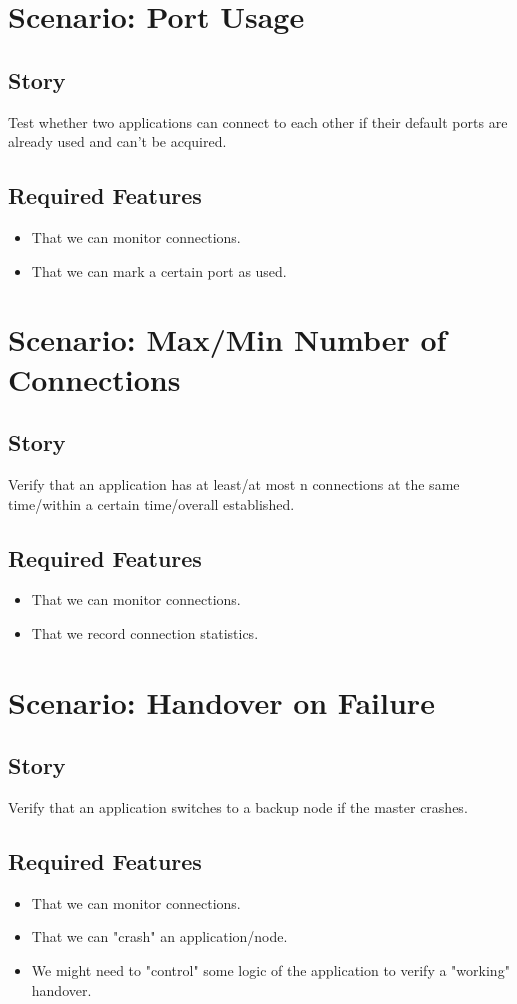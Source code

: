 \documentclass[a4paper,oneside]{book}
\begin{document}
\section{Scenario: Port Usage}
\subsection{Story}
Test whether two applications can connect to each other if their default ports are already used and can't be acquired.
\subsection{Required Features}
\begin{itemize}
\item That we can monitor connections.
\item That we can mark a certain port as used.
\end{itemize}


\section{Scenario: Max/Min Number of Connections}
\subsection{Story}
Verify that an application has at least/at most n connections at the same time/within a certain time/overall established.
\subsection{Required Features}
\begin{itemize}
\item That we can monitor connections.
\item That we record connection statistics.
\end{itemize}


\section{Scenario: Handover on Failure}
\subsection{Story}
Verify that an application switches to a backup node if the master crashes.
\subsection{Required Features}
\begin{itemize}
\item That we can monitor connections.
\item That we can "crash" an application/node.
\item We might need to "control" some logic of the application to verify a "working" handover.
\end{itemize}
\end{document}
